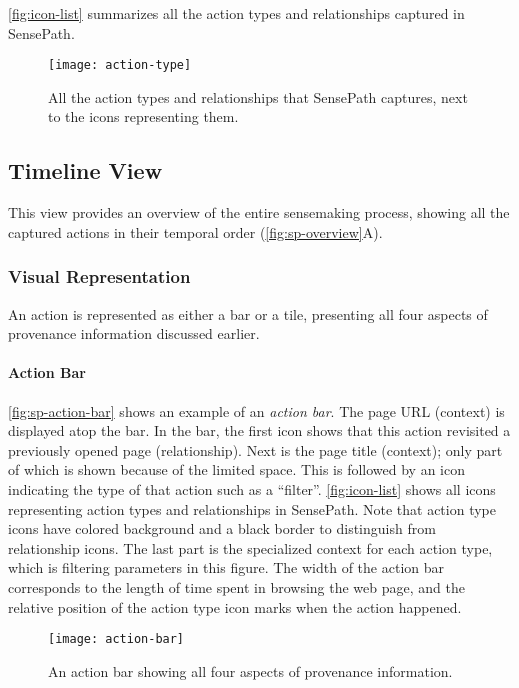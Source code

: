 \autoref{fig:icon-list} summarizes all the action types and relationships captured in SensePath.

\begin{figure}[!htb]
	\centering
	\texttt{[image: action-type]}
	\caption[Action types and relationships]{All the action types and relationships that SensePath captures, next to the icons representing them.}
	\label{fig:icon-list}
\end{figure}

\subsection{Timeline View}
This view provides an overview of the entire sensemaking process, showing all the captured actions in their temporal order (\autoref{fig:sp-overview}A).

\subsubsection{Visual Representation}
An action is represented as either a bar or a tile, presenting all four aspects of provenance information discussed earlier.

\paragraph{Action Bar}
\autoref{fig:sp-action-bar} shows an example of an \textit{action bar}. The page URL (context) is displayed atop the bar. In the bar, the first icon shows that this action revisited a previously opened page (relationship). Next is the page title (context); only part of which is shown because of the limited space. This is followed by an icon indicating the type of that action such as a ``filter''. \autoref{fig:icon-list} shows all icons representing action types and relationships in SensePath. Note that action type icons have colored background and a black border to distinguish from relationship icons. The last part is the specialized context for each action type, which is filtering parameters in this figure. The width of the action bar corresponds to the length of time spent in browsing the web page, and the relative position of the action type icon marks when the action happened.

\begin{figure}[!htb]
\centering
\texttt{[image: action-bar]}
\caption[An action bar]{An action bar showing all four aspects of provenance information.}
\label{fig:sp-action-bar}
\end{figure}


